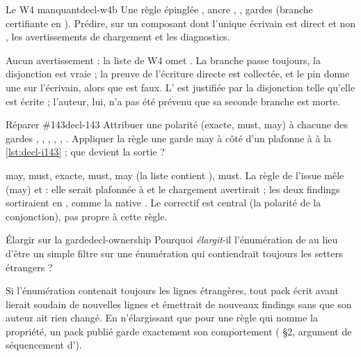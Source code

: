 \begin{exercice}{Le W4 manquant}{decl-w4b}
Une règle épinglée , ancre , , gardes  (branche certifiante en ). Prédire, sur un composant dont l'unique écrivain est direct et non , les avertissements de chargement et les diagnostics.
\end{exercice}
\begin{solution}
Aucun avertissement : la liste de W4 omet . La branche  passe toujours, la disjonction est vraie ; la preuve de l'écriture directe est collectée, et le pin  donne une \Error{} sur l'écrivain, alors que  est faux. L'\Error{} est justifiée par la disjonction telle qu'elle est écrite ; l'auteur, lui, n'a pas été prévenu que sa seconde branche est morte.
\end{solution}

\begin{exercice}{Réparer \#143}{decl-143}
Attribuer une polarité (exacte, must, may) à chacune des gardes , , , , , . Appliquer la règle \og une garde may à côté d'un  plafonne à \Warning{}\fg{} à la \cref{lst:decl-i143} ; que devient la sortie ?
\end{exercice}
\begin{solution}
may, must, exacte, must, may (la liste contient ), must. La règle de l'issue mêle  (may) et  : elle serait plafonnée à \Warning{} et le chargement avertirait ; les deux findings sortiraient en \Warning{}, comme la native . Le correctif est central (la polarité de la conjonction), pas propre à cette règle.
\end{solution}

\begin{exercice}{Élargir sur la garde}{decl-ownership}
Pourquoi  \emph{élargit}-il l'énumération de  au lieu d'être un simple filtre sur une énumération qui contiendrait toujours les setters étrangers ?
\end{exercice}
\begin{solution}
Si l'énumération contenait toujours les lignes étrangères, tout pack écrit avant  lierait soudain de nouvelles lignes et émettrait de nouveaux findings sans que son auteur ait rien changé. En n'élargissant que pour une règle qui nomme la propriété, un pack publié garde exactement son comportement ( §2, argument de séquencement d').
\end{solution}

